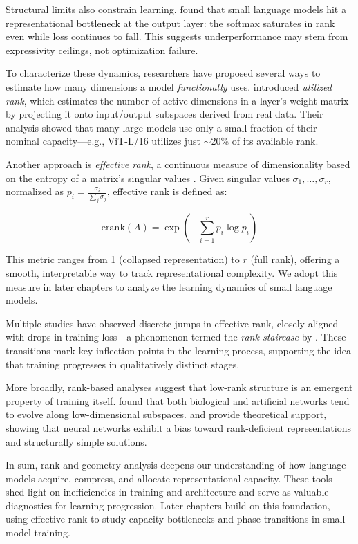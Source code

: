 Structural limits also constrain learning. \citet{godey2024small} found that small language models hit a representational bottleneck at the output layer: the softmax saturates in rank even while loss continues to fall. This suggests underperformance may stem from expressivity ceilings, not optimization failure.

To characterize these dynamics, researchers have proposed several ways to estimate how many dimensions a model \textit{functionally} uses. \citet{garg2025utilizedrank} introduced \textit{utilized rank}, which estimates the number of active dimensions in a layer's weight matrix by projecting it onto input/output subspaces derived from real data. Their analysis showed that many large models use only a small fraction of their nominal capacity—e.g., ViT-L/16 utilizes just $\sim$20\% of its available rank.

Another approach is \textit{effective rank}, a continuous measure of dimensionality based on the entropy of a matrix's singular values \citep{roy2007effectiverank}. Given singular values $\sigma_1, \dots, \sigma_r$, normalized as $p_i = \frac{\sigma_i}{\sum_j \sigma_j}$, effective rank is defined as:

\[
\mathrm{erank}(A) = \exp\left(-\sum_{i=1}^r p_i \log p_i\right)
\]

This metric ranges from 1 (collapsed representation) to $r$ (full rank), offering a smooth, interpretable way to track representational complexity. We adopt this measure in later chapters to analyze the learning dynamics of small language models.

Multiple studies have observed discrete jumps in effective rank, closely aligned with drops in training loss—a phenomenon termed the \textit{rank staircase} by \citet{yang2024rankstaircase}. These transitions mark key inflection points in the learning process, supporting the idea that training progresses in qualitatively distinct stages.

More broadly, rank-based analyses suggest that low-rank structure is an emergent property of training itself. \citet{pellegrino2023lowrank} found that both biological and artificial networks tend to evolve along low-dimensional subspaces. \citet{feng2022rank} and \citet{minyoung2022lowrank} provide theoretical support, showing that neural networks exhibit a bias toward rank-deficient representations and structurally simple solutions.

In sum, rank and geometry analysis deepens our understanding of how language models acquire, compress, and allocate representational capacity. These tools shed light on inefficiencies in training and architecture and serve as valuable diagnostics for learning progression. Later chapters build on this foundation, using effective rank to study capacity bottlenecks and phase transitions in small model training.

